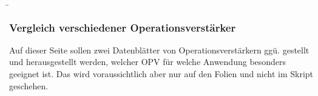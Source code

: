 \begin{frame}
    \b{
        \frametitle{Vergleich verschiedener Operationsverstärker}
        Auf dieser Seite sollen zwei Datenblätter von Operationsverstärkern ggü. gestellt und herausgestellt werden, welcher OPV für welche Anwendung besonders geeignet ist. 
        Das wird voraussichtlich aber nur auf den Folien und nicht im Skript geschehen.
    }
\end{frame}